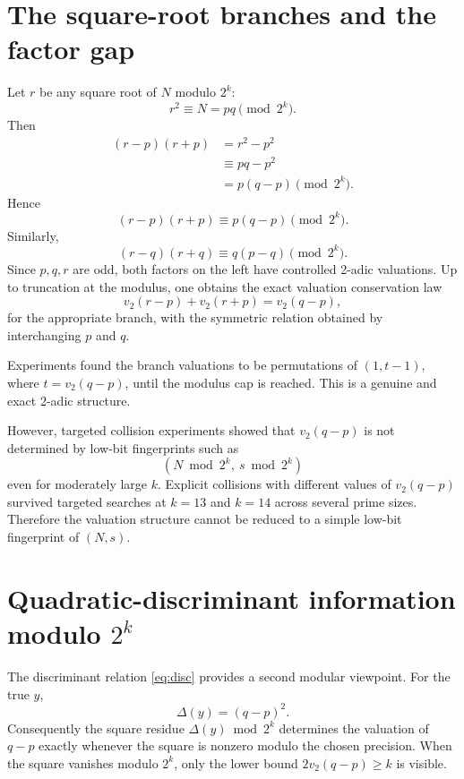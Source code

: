 \documentclass[11pt,a4paper]{article}
\newcommand{\vp}{v_2}
\begin{document}
\section{The square-root branches and the factor gap}
\label{sec:sqrtbranches}

Let \(r\) be any square root of \(N\) modulo \(2^k\):
\begin{equation}
 r^2\equiv N=pq\pmod{2^k}.
\end{equation}
Then
\begin{align}
(r-p)(r+p)&=r^2-p^2\\
&\equiv pq-p^2\\
&=p(q-p)\pmod{2^k}.
\end{align}
Hence
\begin{equation}
\boxed{(r-p)(r+p)\equiv p(q-p)\pmod{2^k}.}
\label{eq:rbranchp}
\end{equation}
Similarly,
\begin{equation}
\boxed{(r-q)(r+q)\equiv q(p-q)\pmod{2^k}.}
\label{eq:rbranchq}
\end{equation}
Since \(p,q,r\) are odd, both factors on the left have controlled 2-adic valuations. Up to truncation at the modulus, one obtains the exact valuation conservation law
\begin{equation}
\boxed{
\vp(r-p)+\vp(r+p)=\vp(q-p),
}
\label{eq:v2gap}
\end{equation}
for the appropriate branch, with the symmetric relation obtained by interchanging \(p\) and \(q\).

Experiments found the branch valuations to be permutations of \((1,t-1)\), where \(t=\vp(q-p)\), until the modulus cap is reached. This is a genuine and exact 2-adic structure.

However, targeted collision experiments showed that \(\vp(q-p)\) is not determined by low-bit fingerprints such as
\[
(N\bmod 2^k,\ s\bmod2^k)
\]
even for moderately large \(k\). Explicit collisions with different values of \(\vp(q-p)\) survived targeted searches at \(k=13\) and \(k=14\) across several prime sizes. Therefore the valuation structure cannot be reduced to a simple low-bit fingerprint of \((N,s)\).

\section{Quadratic-discriminant information modulo \(2^k\)}
\label{sec:discmod}

The discriminant relation \eqref{eq:disc} provides a second modular viewpoint. For the true \(y\),
\[
\Delta(y)=(q-p)^2.
\]
Consequently the square residue \(\Delta(y)\bmod2^k\) determines the valuation of \(q-p\) exactly whenever the square is nonzero modulo the chosen precision. When the square vanishes modulo \(2^k\), only the lower bound \(2\vp(q-p)\ge k\) is visible.
\end{document}
